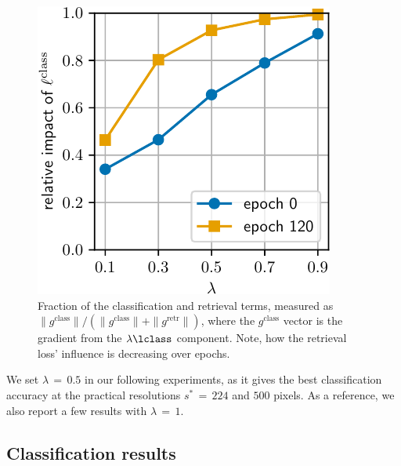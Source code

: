 \begin{figure}[t]
\centering
\begin{minipage}{0.5\linewidth}
\includegraphics[width=\linewidth]{figs/gradients/gradients}
\end{minipage}
\hfill
\begin{minipage}{0.45\linewidth}
\caption{\label{fig:gradients}
    Fraction of the classification and retrieval terms, measured as $\|g^\mathrm{class}\| / (\|g^\mathrm{class}\| + \|g^\mathrm{retr}\|)$, where the $g^\mathrm{class}$ vector is the gradient from the $\lambda \lclass$ component.
    Note, how the retrieval loss' influence is decreasing over epochs. 
    }
\end{minipage}
\vspace{-5pt}
\end{figure} 


We set $\lambda$\,$=$\,$0.5$ in our following experiments, as it gives the best classification accuracy at the practical resolutions $s^*$\,$=$\,$224$ and $500$ pixels. 
%
As a reference, we also report a few results with $\lambda$\,$=$\,$1$. 
%
%
%

\subsection{Classification results \label{sec:classif-results}}


